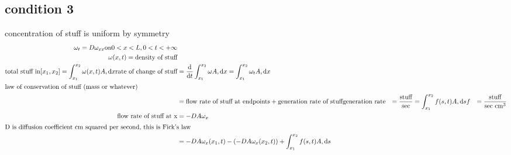 \documentclass{article}
\begin{document}
\subsection*{condition 3}
concentration of stuff is uniform by symmetry
\begin{align*}
  \omega_t=D\omega_{xx} \text{on} 0<x<L, 0<t<+\infty\\
  \omega(x,t)=\text{density of stuff}\\
  \text{total stuff in} [x_1,x_2]=\int_{x_1}^{x_2}{\omega(x,t)A,\mathrm{d}x}
  \text{rate of change of stuff}&=\frac{\mathrm{d}}{\mathrm{d}t}\int_{x_1}^{x_2}{\omega A,\mathrm{d}x}=\int_{x_1}^{x_2}{\omega_t A,\mathrm{d}x}\\
  \intertext{law of conservation of stuff (mass or whatever)}
  &=\text{flow rate of stuff at endpoints}+\text{generation rate of stuff}
  \text{generation rate}&=\frac{\text{stuff}}{\text{sec}}=\int_{x_1}^{x_2}{f(s,t)A,\mathrm{d}s} & f&=\frac{\text{stuff}}{\text{sec cm}^3}\\
  \text{flow rate of stuff at x}&=-DA\omega_x\\
  \intertext{D is diffusion coefficient cm squared per second, this is Fick's law}
  &=-DA\omega_x(x_1,t)-(-DA\omega_x(x_2,t))+\int_{x_1}^{x_2}{f(s,t)A,\mathrm{d}s}
\end{align*}
\end{document}
